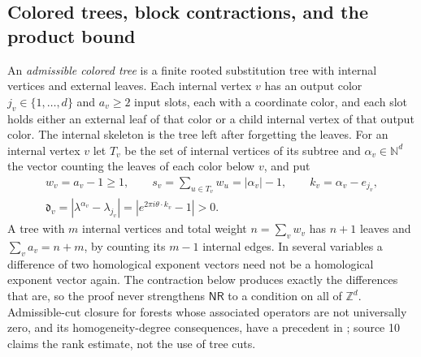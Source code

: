 \documentclass[11pt,letterpaper]{article}
\theoremstyle{definition}
\theoremstyle{remark}
\newcommand{\Z}{\mathbb Z}
\newcommand{\N}{\mathbb N}
\newcommand{\nres}{\mathsf{NR}}
\numberwithin{equation}{section}
\begin{document}
\subsection{Colored trees, block contractions, and the product bound}
\label{dyn:nsc:subsec:trees}

An \emph{admissible colored tree} is a finite rooted substitution tree with
internal vertices and external leaves. Each internal vertex $v$ has an
output color $j_v\in\{1,\dots,d\}$ and $a_v\ge2$ input slots, each with a
coordinate color, and each slot holds either an external leaf of that color
or a child internal vertex of that output color. The internal skeleton is
the tree left after forgetting the leaves. For an internal vertex $v$ let
$T_v$ be the set of internal vertices of its subtree and $\alpha_v\in\N^{d}$
the vector counting the leaves of each color below $v$, and put
\begin{equation}\label{dyn:nsc:eq:weights}
\begin{gathered}
 w_v=a_v-1\ge1,\qquad s_v=\sum_{u\in T_v}w_u=|\alpha_v|-1,\qquad
 k_v=\alpha_v-e_{j_v},\\
 \mathfrak d_v=|\lambda^{\alpha_v}-\lambda_{j_v}|=|e^{2\pi i\theta\cdot k_v}-1|>0 .
\end{gathered}
\end{equation}
A tree with $m$ internal vertices and total weight $n=\sum_vw_v$ has $n+1$
leaves and $\sum_va_v=n+m$, by counting its $m-1$ internal edges. In several
variables a difference of two homological exponent vectors need not be a
homological exponent vector again. The contraction below produces exactly
the differences that are, so the proof never strengthens $\nres$ to a
condition on all of $\Z^{d}$. Admissible-cut closure for forests whose
associated operators are not universally zero, and its homogeneity-degree
consequences, have a precedent in \cite[Thm.~E and Prop.~5.6]{FMS26}; source
10 claims the rank estimate, not the use of tree cuts.
\end{document}
